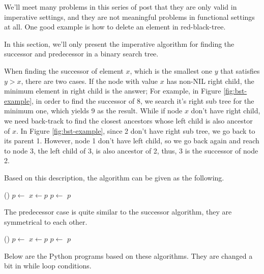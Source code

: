\documentclass{article}
\begin{document}
We'll meet many problems in this series of post that they are only valid
in imperative settings, and they are not meaningful problems in functional
settings at all. One good example is how to delete an element in 
red-black-tree\cite{okasaki-blog}.

In this section, we'll only present the imperative algorithm for finding
the successor and predecessor in a binary search tree.

When finding the successor of element $x$, which is the smallest one $y$
that satisfies $y > x$, there are two cases. If the node with value $x$
has non-NIL right child, the minimum element in right child is the answer;
For example, in Figure \ref{fig:bst-example}, in order to find the successor
of 8, we search it's right sub tree for the minimum one, which yields 9
as the result. While if node $x$ don't have right child, we need 
back-track to find the closest ancestors whose left child is also ancestor
of $x$. In Figure \ref{fig:bst-example}, since 2 don't have right sub tree,
we go back to its parent 1. However, node 1 don't have left child, so we
go back again and reach to node 3, the left child of 3, is also ancestor
of 2, thus, 3 is the successor of node 2.

Based on this description, the algorithm can be given as the following.

\begin{algorithmic}[1]
    \State \Return {}()
  \Else
    \State $p \gets $ 
      \State $x \gets p$
      \State $p \gets $ 
    \EndWhile
    \State \Return $p$
  \EndIf
\EndFunction
\end{algorithmic}

The predecessor case is quite similar to the successor algorithm, they
are symmetrical to each other. 

\begin{algorithmic}[1]
    \State \Return {}()
  \Else
    \State $p \gets $ 
      \State $x \gets p$
      \State $p \gets $ 
    \EndWhile
    \State \Return $p$
  \EndIf
\EndFunction
\end{algorithmic}

Below are the Python programs based on these algorithms. They are changed
a bit in while loop conditions.
\end{document}
